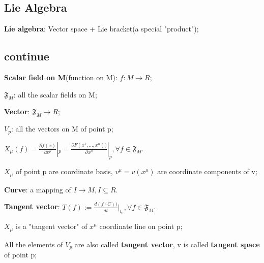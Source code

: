 \documentclass[12pt]{article}
\numberwithin{equation}{section}
\begin{document}
\subsection{Lie Algebra}
	\textbf{Lie algebra}: Vector space + Lie bracket(a special "product");	
\subsection{continue}
	\textbf{Scalar field on M}(function on M): $f:M \rightarrow R$; \par
	$\mathfrak{F}_M$: all the scalar fields on M; \par
	\textbf{Vector}: $\mathfrak{F}_M\rightarrow R$; \par
	$V_p$: all the vectors on M of point p; \par
	$X_\mu(f)=\frac{\partial f(x)}{\partial x^\mu}|_p = \frac{\partial F(x^1,...,x^n))}{\partial x^\mu}|_p, \forall f \in \mathfrak{F}_M$. \par
	${X_\mu}$ of point p are coordinate basis, $v^\mu=v(x^\mu)$ are coordinate components of v;\par
	\textbf{Curve}: a mapping of $I\rightarrow M, I\subseteq R$.\par
	\textbf{Tangent vector}: $T(f):=\frac{d(f\circ C))}{dt}|_{t_0}, \forall f \in \mathfrak{F}_M$.\par
	$X_\mu$ is a "tangent vector" of $x^\mu$ coordinate line on point p;\par
	All the elements of $V_p$ are also called \textbf{tangent vector}, v is called \textbf{tangent space} of point p;
\renewcommand\refname{Reference}

 
\clearpage
\end{document}
